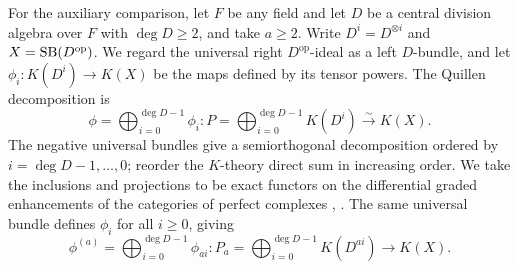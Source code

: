 For the auxiliary comparison, let $F$ be any field and let $D$ be a central division algebra over $F$ with $\deg D\ge2$, and take $a\ge2$.
Write $D^i=D^{\otimes i}$ and $X=\operatorname{SB}(D^{\mathrm{op}})$.
We regard the universal right $D^{\mathrm{op}}$-ideal as a left $D$-bundle, and let $\phi_i:K(D^i)\to K(X)$ be the maps defined by its tensor powers.
The Quillen decomposition is
\[
 \phi=\bigoplus_{i=0}^{\deg D-1}\phi_i:
 P=\bigoplus_{i=0}^{\deg D-1}K(D^i)\xrightarrow{\sim}K(X).
\]
The negative universal bundles give a semiorthogonal decomposition ordered by $i=\deg D-1,\ldots,0$; reorder the $K$-theory direct sum in increasing order.
We take the inclusions and projections to be exact functors on the differential graded enhancements of the categories of perfect complexes \cite[\S8]{QuillenHigher}, \cite[Theorem 4.1]{Bernardara2009}.
The same universal bundle defines $\phi_i$ for all $i\ge0$, giving
\[
 \phi^{(a)}=\bigoplus_{i=0}^{\deg D-1}\phi_{ai}:
 P_a=\bigoplus_{i=0}^{\deg D-1}K(D^{ai})\longrightarrow K(X).
\]

